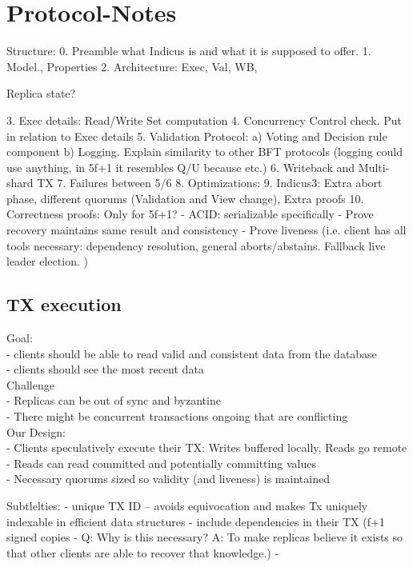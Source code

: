 \section{Protocol-Notes}

Structure:
0. Preamble what Indicus is and what it is supposed to offer.
1. Model., Properties   
2. Architecture: Exec, Val, WB, 

Replica state?

3. Exec details: Read/Write Set computation
4. Concurrency Control check. Put in relation to Exec details
5. Validation Protocol: a) Voting and Decision rule component b) Logging. Explain similarity to other BFT protocols (logging could use anything, in 5f+1 it resembles Q/U because etc.)
6. Writeback and Multi-shard TX
7. Failures between 5/6
8. Optimizations: 
9. Indicus3: Extra abort phase, different quorums (Validation and View change), Extra proofs
10. Correctness proofs: Only for 5f+1?
	- ACID: serializable specifically
	- Prove recovery maintains same result and consistency
	- Prove liveness (i.e. client has all tools necessary: dependency resolution, general aborts/abstains. Fallback live leader election. )

\subsection{TX execution}
Goal:\\
- clients should be able to read valid and consistent data from the database\\
- clients should see the most recent data\\


Challenge\\
- Replicas can be out of sync and byzantine\\
- There might be concurrent transactions ongoing that are conflicting\\

Our Design:\\
- Clients speculatively execute their TX: Writes buffered locally, Reads go remote\\
- Reads can read committed and potentially committing values\\
- Necessary quorums sized so validity (and liveness) is maintained

Subtlelties:
- unique TX ID -- avoids equivocation and makes Tx uniquely indexable in efficient data structures
- include dependencies in their TX (f+1 signed copies - Q: Why is this necessary? A: To make replicas believe it exists so that other clients are able to recover that knowledge.)
- 

